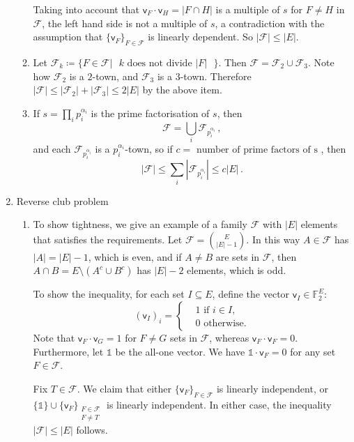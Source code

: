 \documentclass[kulak]{tplt}
\theoremstyle{definition}
\newcommand{\F}{\mathbb{F}}
\newcommand{\FF}{\mathcal F}
\newcommand{\vv}{\mathsf{v}}
\begin{document}
\begin{enumerate}
\begin{enumerate}
Taking into account that $\vv_F \cdot \vv_H = |F \cap H|$ is a multiple of $s$ for $F\neq H$ in $\FF$, the left hand side is not a multiple of $s$, a contradiction with the assumption that $\{\vv_F\}_{F\in \FF}$ is linearly dependent.
So $|\FF | \leq |E|$.

\item 
Let $\FF_k \coloneqq \{F \in \FF | \text{ $k$ does not divide $|F|$ } \}$.
Then $\FF = \FF_2 \cup \FF_3$.
Note how $\FF_2$ is a $2$-town, and $\FF_3$ is a $3$-town.
Therefore $|\FF| \leq |\FF_2| + |\FF_3| \leq 2|E|$ by the above item.


\item
If $s = \prod_i p_i^{\alpha_i}$ is the prime factorisation of $s$, then 
$$ \FF = \bigcup_i \FF_{p_i^{\alpha_i}}\, , $$
and each $\FF_{p_i^{\alpha_i}}$ is a $p_i^{\alpha_i}$-town, so if $c = \text{ number of prime factors of s }$, then
$$|\FF | \leq \sum_i |\FF_{p_i^{\alpha_i}}| \leq c |E| \, . $$
\end{enumerate}

\vspace{.8cm}

\item Reverse club problem

\begin{enumerate}
\item 
To show tightness, we give an example of a family $\FF$ with $|E|$ elements that satisfies the requirements.
Let $\FF = \binom{E}{|E| - 1}$.
In this way $A \in \FF $ has $|A| = |E| - 1$, which is even, and if $A\neq B $ are sets in $\FF$, then $A\cap B = E\setminus (A^c \cup B^c) $ has $|E| - 2$ elements, which is odd.

To show the inequality, for each set $I \subseteq E$, define the vector $\vv_I \in \F_2^E$:
$$ (\vv_I)_i =\begin{cases*}
      & 1 \text{ if $i \in I$,}\\
      & 0 \text{ otherwise.}
    \end{cases*} $$
Note that $\vv_F \cdot \vv_G = 1$ for $F\neq G$ sets in $\FF$, whereas $\vv_F \cdot \vv_F = 0$.
Furthermore, let $\mathbb{1} $ be the all-one vector.
We have $\mathbb{1} \cdot \vv_F = 0$ for any set $F \in \FF$.


Fix $T \in \FF$.
We claim that either $\{\vv_F\}_{F \in \FF}$ is linearly independent, or $\{\mathbb{1}\} \cup \{\vv_F\}_{\substack{F \in \FF \\ F \neq T}}$ is linearly independent.
In either case, the inequality $|\FF| \leq |E|$ follows.


\end{enumerate}
\end{enumerate}
\end{document}
